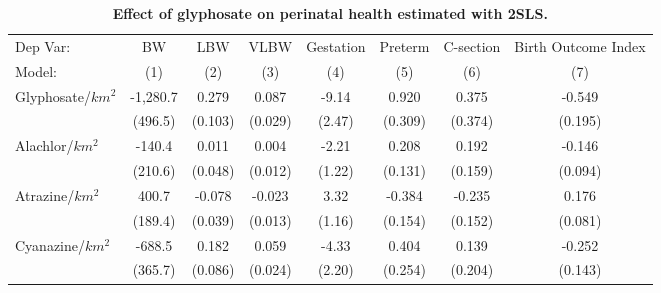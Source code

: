 \begin{table}[htbp]
   \caption{\label{tab:main-outcomes-controls} \textbf{Effect of glyphosate on perinatal health estimated with 2SLS.}}
   \centering
   \begin{tabular}{lccccccc}
      \toprule
      Dep Var:                  & BW                      & LBW                     & VLBW                    & Gestation               & Preterm                 & C-section               & Birth Outcome Index\\  
      Model:                    & (1)                     & (2)                     & (3)                     & (4)                     & (5)                     & (6)                     & (7)\\  
      \midrule 
      Glyphosate/$km^2$         & -1,280.7                & 0.279                   & 0.087                   & -9.14                   & 0.920                   & 0.375                   & -0.549\\   
                                & (496.5)                 & (0.103)                 & (0.029)                 & (2.47)                  & (0.309)                 & (0.374)                 & (0.195)\\   
      Alachlor/$km^2$           & -140.4                  & 0.011                   & 0.004                   & -2.21                   & 0.208                   & 0.192                   & -0.146\\   
                                & (210.6)                 & (0.048)                 & (0.012)                 & (1.22)                  & (0.131)                 & (0.159)                 & (0.094)\\   
      Atrazine/$km^2$           & 400.7                   & -0.078                  & -0.023                  & 3.32                    & -0.384                  & -0.235                  & 0.176\\   
                                & (189.4)                 & (0.039)                 & (0.013)                 & (1.16)                  & (0.154)                 & (0.152)                 & (0.081)\\   
      Cyanazine/$km^2$          & -688.5                  & 0.182                   & 0.059                   & -4.33                   & 0.404                   & 0.139                   & -0.252\\   
                                & (365.7)                 & (0.086)                 & (0.024)                 & (2.20)                  & (0.254)                 & (0.204)                 & (0.143)\\   

\end{tabular}
\end{table}
